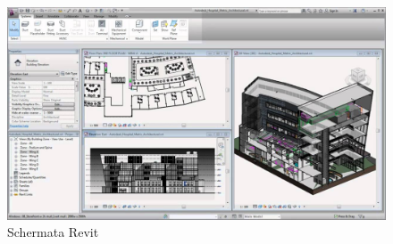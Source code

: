\begin{figure}[htbp] %
   \centering
   \includegraphics[width=1\linewidth]{images/maxresdefault}
   \caption{Schermata Revit}
   \label{fig:revit}
   \end{figure}
   \newpage
